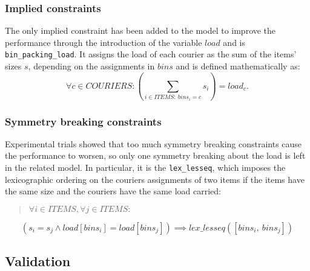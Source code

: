 \subsubsection{Implied constraints}
The only implied constraint has been added to the model to improve the performance through the introduction of the variable $load$ and is \texttt{bin\_packing\_load}. It assigns the load of each courier as the sum of the items' sizes $s$, depending on the assignments in $bins$ and is defined mathematically as:
\begin{equation}
    \forall c \in COURIERS: \left( \sum_{i \in ITEMS:\ bins_i = c} s_i \right) = load_c.
\end{equation}

\subsubsection{Symmetry breaking constraints}
Experimental trials showed that too much symmetry breaking constraints cause the performance to worsen, so only one symmetry breaking about the load is left in the related model. In particular, it is the \texttt{lex\_lesseq}, which imposes the lexicographic ordering on the couriers assignments of two items if the items have the same size and the couriers have the same load carried:
\begin{quote}
    \centering
    $\forall i \in ITEMS, \forall j \in ITEMS:$
\end{quote}
\begin{equation}
    (s_i = s_j \land load[bins_i] = load[bins_j]) \implies lex\_lesseq([bins_i,\ bins_j])
\end{equation}



\subsection{Validation}

